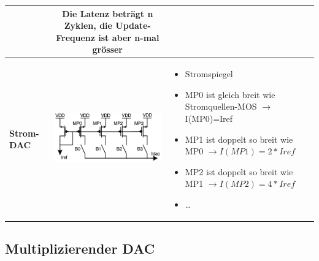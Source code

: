 \begin{longtable}{|>{\bfseries}p{4cm}|c|p{8cm}|}
	& Die Latenz beträgt n Zyklen, die Update-Frequenz ist aber n-mal grösser
	\\ \hline
	Strom-DAC
	& \includegraphics[width=6cm, valign=t]{pictures/stromDAC}
	& \begin{itemize}
  		\item Stromspiegel
  		\item MP0 ist gleich breit wie Stromquellen-MOS $\to$ I(MP0)=Iref
  		\item MP1 ist doppelt so breit wie MP0 $\to I(MP1)=2*Iref$
  		\item MP2 ist doppelt so breit wie MP1 $\to I(MP2)=4*Iref$
  		\item \ldots
	  \end{itemize}
	\\ \hline
\end{longtable}


\subsection{Multiplizierender DAC} 


